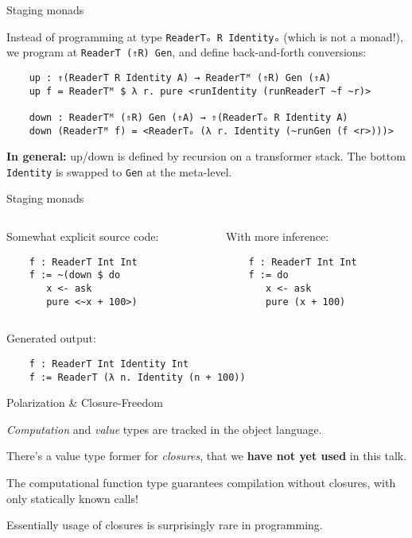 \documentclass[dvipsnames,aspectratio=169]{beamer}
\newcommand{\ttt}[1]{{\texttt{#1}}}
\theoremstyle{remark}
\begin{document}
\begin{frame}[fragile]{Staging monads}

Instead of programming at type \ttt{ReaderTₒ R Identityₒ} (which is not a
monad!), we program at \ttt{ReaderT (⇑R) Gen}, and define back-and-forth
conversions:

\begin{verbatim}
    up : ⇑(ReaderT R Identity A) → ReaderTᴹ (⇑R) Gen (⇑A)
    up f = ReaderTᴹ $ λ r. pure <runIdentity (runReaderT ~f ~r)>

    down : ReaderTᴹ (⇑R) Gen (⇑A) → ⇑(ReaderTₒ R Identity A)
    down (ReaderTᴹ f) = <ReaderTₒ (λ r. Identity (~runGen (f <r>)))>
\end{verbatim}

\begin{block}{}
\textbf{In general:} up/down is defined by recursion on a transformer stack. The
bottom \ttt{Identity} is swapped to \ttt{Gen} at the meta-level.
\end{block}
\end{frame}


\begin{frame}[fragile]{Staging monads}

\begin{columns}
\begin{column}{0.5\textwidth}
Somewhat explicit source code:
\begin{verbatim}
    f : ReaderT Int Int
    f := ~(down $ do
       x <- ask
       pure <~x + 100>)
\end{verbatim}
\end{column}
\begin{column}{0.5\textwidth}
With more inference:
\begin{verbatim}
    f : ReaderT Int Int
    f := do
       x <- ask
       pure (x + 100)
\end{verbatim}
\end{column}
\end{columns}
\vspace{2em}

Generated output:
\begin{verbatim}
    f : ReaderT Int Identity Int
    f := ReaderT (λ n. Identity (n + 100))
\end{verbatim}

\end{frame}

\begin{frame}[fragile]{Polarization \& Closure-Freedom}

\emph{Computation} and \emph{value} types are tracked
in the object language.
\vspace{1em}

There's a value type former for \emph{closures},
that we \textbf{have not yet used} in this talk.
\vspace{1em}

The computational function type guarantees compilation
without closures, with only statically known calls!
\vspace{1em}

Essentially usage of closures is surprisingly rare
in programming.

\end{frame}
\end{document}
